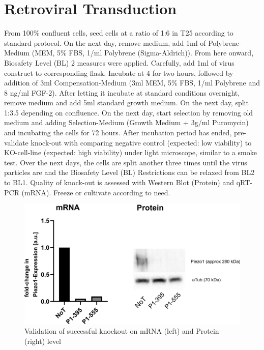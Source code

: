 \section{Retroviral Transduction}
From 100\% confluent cells, seed cells at a ratio of 1:6 in T25 according to standard protocol. On the next day, remove medium, add 1ml of Polybrene-Medium (MEM\textalpha{}, 5\% FBS, 1\mul{}/ml Polybrene (Sigma-Aldrich)). From here onward, Biosafety Level (BL) 2 measures were applied. Carefully, add 1ml of virus construct to corresponding flask. Incubate at 4 \degC for two hours, followed by addition of 3ml Compensation-Medium (3ml MEM\textalpha{}, 5\% FBS, 1\mul{}/ml Polybrene and 8 ng/ml FGF-2). After letting it incubate at standard conditions overnight, remove medium and add 5ml standard growth medium. On the next day, split 1:3.5 depending on confluence. On the next day, start selection by removing old medium and adding Selection-Medium (Growth Medium + 3\textmu{}g/ml Puromycin) and incubating the cells for 72 hours. After incubation period has ended, pre-validate knock-out with comparing negative control (expected: low viability) to KO-cell-line (expected: high viability) under light microscope, similar to a smoke test. Over the next days, the cells are split another three times until the virus particles are  and the Biosafety Level (BL) Restrictions can be relaxed from BL2 to BL1. Quality of knock-out is assessed with Western Blot (Protein) and qRT-PCR (mRNA). Freeze or cultivate according to need. 

\begin{figure}
    \centering
    \includegraphics[width=\linewidth]{Piezo1KO_Verification_WBandPCR.png}
    \caption{Validation of successful knockout on mRNA (left) and Protein (right) level}
    \label{fig:KO-Verification}
\end{figure}

